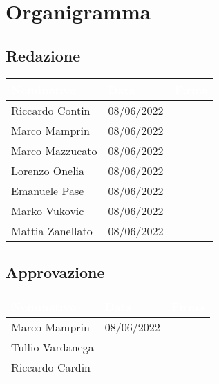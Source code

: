 \chapter{Organigramma}
\renewcommand\arraystretch{2,3}

\section{Redazione}

\begin{center}
  \centering
  \begin{longtable}{|C{3,5cm}|C{2.2cm}|C{6,5cm}|}
    \hline
    \textcolor[HTML]{FFFFFF}{\textbf{Nominativo}} & \textcolor[HTML]{FFFFFF}{\textbf{Data}} & \textcolor[HTML]{FFFFFF}{\textbf{Firma}} \\ \hline
    Riccardo Contin & 08/06/2022 &  \\ \hline
    Marco Mamprin & 08/06/2022 &  \\ \hline
    Marco Mazzucato & 08/06/2022 &  \\ \hline
    Lorenzo Onelia & 08/06/2022 &  \\ \hline
    Emanuele Pase & 08/06/2022 &  \\ \hline
    Marko Vukovic & 08/06/2022 &  \\ \hline
    Mattia Zanellato & 08/06/2022 &  \\ \hline
  \end{longtable}
\end{center}

\section{Approvazione}

\begin{center}
  \centering
  \begin{longtable}{|C{3,5cm}|C{2.2cm}|C{6,5cm}|}
    \hline
    \textcolor[HTML]{FFFFFF}{\textbf{Nominativo}} & \textcolor[HTML]{FFFFFF}{\textbf{Data}} & \textcolor[HTML]{FFFFFF}{\textbf{Firma}} \\ \hline
    Marco Mamprin & 08/06/2022 &  \\ \hline
    Tullio Vardanega &  &  \\ \hline
    Riccardo Cardin &  &  \\ \hline
  \end{longtable}
\end{center}

